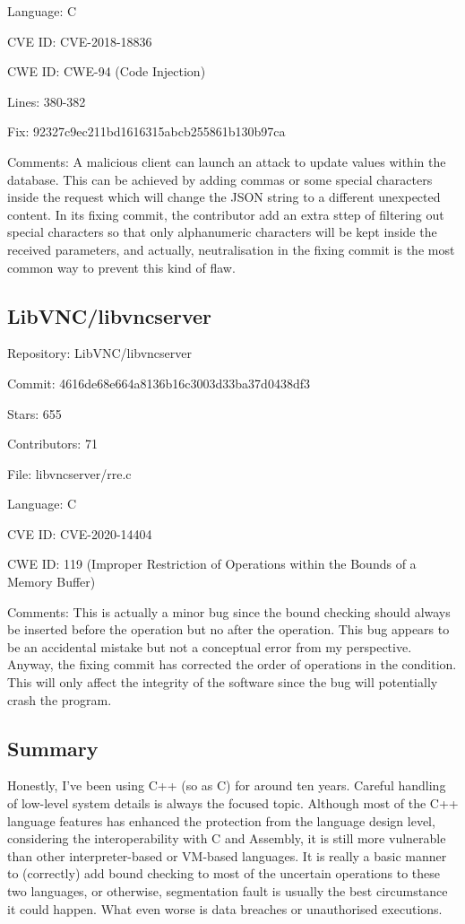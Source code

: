 \documentclass[12pt]{article}
\begin{document}
Language: C

CVE ID: CVE-2018-18836

CWE ID: CWE-94 (Code Injection)

Lines: 380-382

Fix: 92327c9ec211bd1616315abcb255861b130b97ca

Comments: A malicious client can launch an attack to update values within the database. This can be achieved by adding commas or some special characters inside the request which will change the JSON string to a different unexpected content. In its fixing commit, the contributor add an extra sttep of filtering out special characters so that only alphanumeric characters will be kept inside the received parameters, and actually, neutralisation in the fixing commit is the most common way to prevent this kind of flaw.

\subsection{LibVNC/libvncserver}

Repository: LibVNC/libvncserver

Commit: 4616de68e664a8136b16c3003d33ba37d0438df3

Stars: 655

Contributors: 71

File: libvncserver/rre.c

Language: C

CVE ID: CVE-2020-14404

CWE ID: 119 (Improper Restriction of Operations within the Bounds of a Memory Buffer)

Comments: This is actually a minor bug since the bound checking should always be inserted before the operation but no after the operation. This bug appears to be an accidental mistake but not a conceptual error from my perspective. Anyway, the fixing commit has corrected the order of operations in the condition. This will only affect the integrity of the software since the bug will potentially crash the program.

\subsection{Summary}

Honestly, I've been using C++ (so as C) for around ten years. Careful handling of low-level system details is always the focused topic. Although most of the C++ language features has enhanced the protection from the language design level, considering the interoperability with C and Assembly, it is still more vulnerable than other interpreter-based or VM-based languages. It is really a basic manner to (correctly) add bound checking to most of the uncertain operations to these two languages, or otherwise, segmentation fault is usually the best circumstance it could happen. What even worse is data breaches or unauthorised executions.
\end{document}
